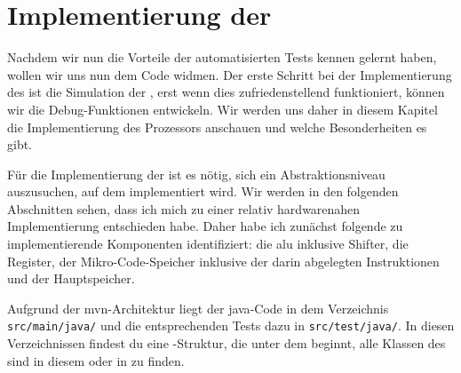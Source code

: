 \chapter{Implementierung der \mic}
Nachdem wir nun die Vorteile der automatisierten Tests kennen gelernt haben, wollen wir uns nun dem Code widmen. Der erste Schritt bei der Implementierung des \md ist die Simulation der \mic, erst wenn dies zufriedenstellend funktioniert, können wir die Debug-Funktionen entwickeln. Wir werden uns daher in diesem Kapitel die Implementierung des Prozessors anschauen und welche Besonderheiten es gibt.

Für die Implementierung der \mic ist es nötig, sich ein Abstraktionsniveau auszusuchen, auf dem implementiert wird. Wir werden in den folgenden Abschnitten sehen, dass ich mich zu einer relativ hardwarenahen Implementierung entschieden habe. Daher habe ich zunächst folgende zu implementierende Komponenten identifiziert: die \gls{alu} inklusive Shifter, die Register, der Mikro-Code-Speicher inklusive der darin abgelegten Instruktionen und der Hauptspeicher.

Aufgrund der \gls{mvn}-Architektur liegt der \gls{java}-Code in dem Verzeichnis \texttt{src/main/java/} und die entsprechenden Tests dazu in \texttt{src/test/java/}. In diesen Verzeichnissen findest du eine \package-Struktur, die unter dem \package {} beginnt, alle Klassen des \md sind in diesem \package oder in \subpackages zu finden.

